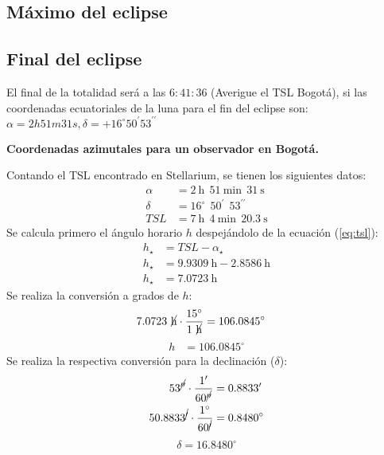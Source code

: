 \begin{multicols}{2}
   \subsection{Máximo del eclipse}
   
   
   \subsection{Final del eclipse}
   
   El final de la totalidad será a las $6:41:36$ (Averigue el TSL Bogotá), si las coordenadas ecuatoriales de la luna para el fin del
   eclipse son: $\alpha= 2h 51m 31s, \delta = +16^{\circ} 50^{\prime} 53^{\prime \prime}$
   
   \textbf{Coordenadas azimutales para un observador en Bogotá.}
   
   Contando el TSL encontrado en Stellarium, se tienen los siguientes datos:
   \begin{align*}
   \alpha &= 2~\mathrm{h}~~ 51~ \mathrm{min}~~ 31~ \mathrm{s} \\
   \delta &= 16^{\circ}~~ 50^{\prime}~~ 53^{\prime \prime}\\
   TSL &= 7~\mathrm{h}~~ 4~\mathrm{min}~~ 20.3~\mathrm{s}
   \end{align*}
   Se calcula primero el ángulo horario $h$ despejándolo de la ecuación (\ref{eq:tsl}):
   \begin{align*}
       h_{\star} &=  TSL - \alpha_{\star} \\
       h_{\star} &=  9.9309~\mathrm{h} - 2.8586~\mathrm{h} \\
       h_{\star} &=  7.0723~\mathrm{h}%
   \end{align*}
   Se realiza la conversión a grados de $h$:
   \begin{align*}
   7.0723~ \cancel{\mathrm{h}} \cdot \frac{15 ^{\circ}}{1~ \cancel{\mathrm{h}}} & =106.0845 ^{\circ} 
   \end{align*}
   \begin{align*}
   h &= 106.0845 ^{\circ}
   \end{align*}
   Se realiza la respectiva conversión para la declinación ($\delta$):
   \begin{align*}
   53^{\cancel{\prime \prime}}\cdot \frac{1^{\prime} }{60^{\cancel{\prime \prime}} } &=0.8833^{\prime}\\ 
   50.8833 ^{\cancel{\prime}}\cdot \frac{1 ^{\circ} }{60^{\cancel{\prime}}} &=0.8480^{\circ}
   \end{align*}
   \begin{align*}
   \delta = 16.8480^{\circ}
   \end{align*}
   

\end{multicols}
